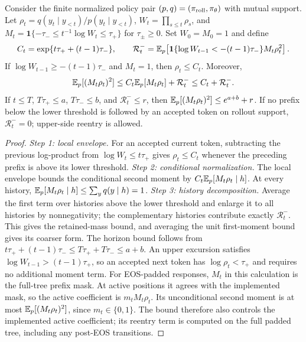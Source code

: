\begin{theorem}
\label{thm:prefix-reentry-moment}
Consider the finite normalized policy pair $(p,q)=(\pi_{\mathrm{roll}},\pi_{\theta})$ with
mutual support. Let $\rho_t=q(y_t\mid y_{<t})/p(y_t\mid y_{<t})$,
$W_t=\prod_{s\le t}\rho_s$, and
$M_t=\mathbf 1\{-\tau_-\le t^{-1}\log W_t\le\tau_+\}$ for
$\tau_\pm\ge0$. Set $W_0=M_0=1$ and define
\[
 C_t=\exp\{t\tau_+ +(t-1)\tau_-\},\qquad
 \mathcal R_t^-=\mathbb{E}_p\!\left[
 \mathbf 1\{\log W_{t-1}<-(t-1)\tau_-\}M_t\rho_t^2\right].
\]
If $\log W_{t-1}\ge-(t-1)\tau_-$ and $M_t=1$, then $\rho_t\le C_t$.
Moreover,
\begin{equation}
 \mathbb{E}_p[(M_t\rho_t)^2]\le C_t\mathbb{E}_p[M_t\rho_t]+\mathcal R_t^-
 \le C_t+\mathcal R_t^-.
 \label{eq:prefix-reentry-moment}
\end{equation}
If $t\le T$, $T\tau_+\le a$, $T\tau_-\le b$, and
$\mathcal R_t^-\le r$, then
$\mathbb{E}_p[(M_t\rho_t)^2]\le e^{a+b}+r$.
If no prefix below the lower threshold is followed by an accepted token
on rollout support, $\mathcal R_t^-=0$; upper-side reentry is allowed.
\end{theorem}
\begin{proof}
\emph{Step 1: local envelope.} For an accepted current token, subtracting
the previous log-product from
$\log W_t\le t\tau_+$ gives $\rho_t\le C_t$ whenever the preceding prefix
is above its lower threshold.
\emph{Step 2: conditional normalization.} The local envelope bounds
the conditional second moment by $C_t\mathbb{E}_p[M_t\rho_t\mid h]$.
At every history, $\mathbb{E}_p[M_t\rho_t\mid h]\le\sum_y q(y\mid h)=1$.
\emph{Step 3: history decomposition.} Average the first term over histories
above the lower threshold and enlarge it to all histories by nonnegativity;
the complementary histories contribute exactly $\mathcal R_t^-$.
This gives the retained-mass bound, and averaging the unit first-moment bound
gives its coarser form. The horizon bound follows from
$t\tau_++(t-1)\tau_-\le T\tau_++T\tau_-\le a+b$.
An upper excursion satisfies $\log W_{t-1}>(t-1)\tau_+$, so an accepted
next token has $\log \rho_t<\tau_+$ and requires no additional moment term.
For EOS-padded responses, $M_t$ in this calculation is the full-tree prefix
mask. At active positions it agrees with the implemented mask, so the
active coefficient is $m_tM_t\rho_t$. Its unconditional second moment is at
most $\mathbb{E}_p[(M_t\rho_t)^2]$, since $m_t\in\{0,1\}$. The bound therefore also
controls the implemented active coefficient; its reentry term is computed
on the full padded tree, including any post-EOS transitions.
\end{proof}


